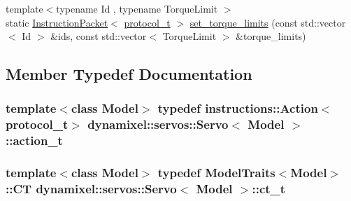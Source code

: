 \begin{DoxyCompactItemize}
\item 
{\footnotesize template$<$typename Id , typename Torque\+Limit $>$ }\\static \hyperlink{classdynamixel_1_1_instruction_packet}{Instruction\+Packet}$<$ \hyperlink{classdynamixel_1_1servos_1_1_servo_a7718c41cee1187b992836f4b6bad8a38}{protocol\+\_\+t} $>$ \hyperlink{classdynamixel_1_1servos_1_1_servo_ab10774b1d3d5532f19df4d535d33e369}{set\+\_\+torque\+\_\+limits} (const std\+::vector$<$ Id $>$ \&ids, const std\+::vector$<$ Torque\+Limit $>$ \&torque\+\_\+limits)
\end{DoxyCompactItemize}


\subsection{Member Typedef Documentation}
\hypertarget{classdynamixel_1_1servos_1_1_servo_ad4d14ab8f1ea33479dce5fc2c7790ded}{}
\subsubsection[{action\+\_\+t}]{\setlength{\rightskip}{0pt plus 5cm}template$<$class Model$>$ typedef {\bf instructions\+::\+Action}$<${\bf protocol\+\_\+t}$>$ {\bf dynamixel\+::servos\+::\+Servo}$<$ Model $>$\+::{\bf action\+\_\+t}}\label{classdynamixel_1_1servos_1_1_servo_ad4d14ab8f1ea33479dce5fc2c7790ded}
\hypertarget{classdynamixel_1_1servos_1_1_servo_a882738edc68b4e641e066954f59896d3}{}
\subsubsection[{ct\+\_\+t}]{\setlength{\rightskip}{0pt plus 5cm}template$<$class Model$>$ typedef {\bf Model\+Traits}$<$Model$>$\+::C\+T {\bf dynamixel\+::servos\+::\+Servo}$<$ Model $>$\+::{\bf ct\+\_\+t}}\label{classdynamixel_1_1servos_1_1_servo_a882738edc68b4e641e066954f59896d3}
\hypertarget{classdynamixel_1_1servos_1_1_servo_abbf04a51c076bfbf234179bb59fd45a2}{}

